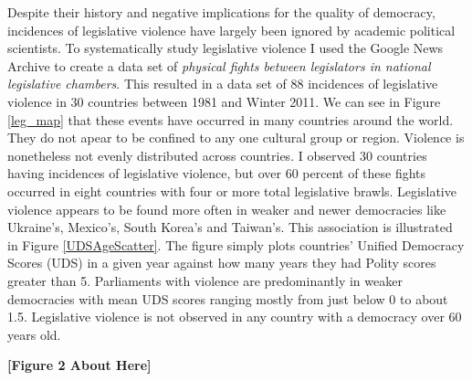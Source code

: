 \documentclass[a4paper]{article}\usepackage{graphicx, color}
\begin{document}
Despite their history and negative implications for the quality of democracy, incidences of legislative violence have largely been ignored by academic political scientists. To systematically study legislative violence I used the Google News Archive to create a data set of {\emph{physical fights between legislators in national legislative chambers}}. This resulted in a data set of 88 incidences of legislative violence in 30 countries between 1981 and Winter 2011. We can see in Figure \ref{leg_map} that these events have occurred in many countries around the world. They do not apear to be confined to any one cultural group or region. Violence is nonetheless not evenly distributed across countries. I observed 30 countries having incidences of legislative violence, but over 60 percent of these fights occurred in eight countries with four or more total legislative brawls. Legislative violence appears to be found more often in weaker and newer democracies like Ukraine's, Mexico's, South Korea's and Taiwan's. This association is illustrated in Figure \ref{UDSAgeScatter}. The figure simply plots countries' Unified Democracy Scores (UDS) \citep{Pemstein2010} in a given year against how many years they had Polity scores greater than 5. Parliaments with violence are predominantly in weaker democracies with mean UDS scores ranging mostly from just below 0 to about 1.5. Legislative violence is not observed in any country with a democracy over 60 years old.

\begin{center}

    {\bf{[Figure 2 About Here]}}

\end{center}
\end{document}
